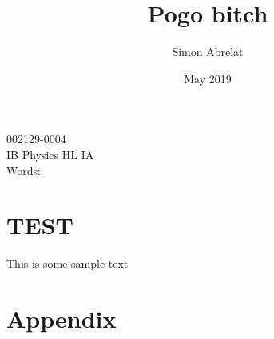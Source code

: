 \documentclass[12pt, letterpaper]{article}
\title{Pogo bitch}
\author{Simon Abrelat}
\date{May 2019}
\begin{document}
\large
\doublespace{}
\parindent=0.5in

{\fontsize{12}{14.4}
  {\singlespace
    \maketitle
    \begin{center}
    002129-0004 \\
    \vspace{4mm}
    IB Physics HL IA \\
    \vspace{4mm}
    Words:  \\ %
    \end{center}
  }
}	


\newpage
\tableofcontents
{}
\newpage

\section{TEST}
This is some sample text \autocite{Lear71}

\newpage
\printbibliography{}

\newpage
\section{Appendix}
\listoffigures{}
\end{document}
